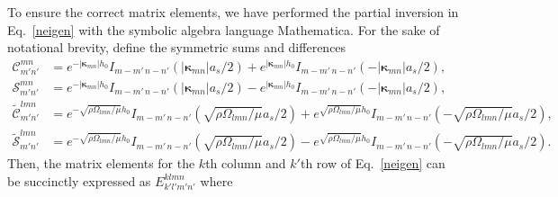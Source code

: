 \documentclass[aps,pre,amsmath,amssymb,floatfix,onecolumn,notitlepage,10pt]{revtex4-1}
\begin{document}
To ensure the correct matrix elements, we have performed the partial inversion in Eq.~\eqref{neigen} with the symbolic algebra language Mathematica.  For the sake of notational brevity, define the symmetric sums and differences
\begin{align*}
\mathcal{C}^{mn}_{m'n'} &= e^{-|\bm{\kappa}_{mn}|h_0}I_{m-m'\, n-n'} \left(|\bm{\kappa}_{mn}|a_s/2\right) + e^{|\bm{\kappa}_{mn}|h_0}I_{m-m'\, n-n'} \left(-|\bm{\kappa}_{mn}|a_s/2\right), \\
\mathcal{S}^{mn}_{m'n'} &= e^{-|\bm{\kappa}_{mn}|h_0}I_{m-m'\, n-n'} \left(|\bm{\kappa}_{mn}|a_s/2\right) - e^{|\bm{\kappa}_{mn}|h_0}I_{m-m'\, n-n'} \left(-|\bm{\kappa}_{mn}|a_s/2\right), \\
\tilde{\mathcal{C}}^{lmn}_{m'n'} &= e^{-\sqrt{\rho\Omega_{lmn}/\mu}h_0}I_{m-m'\, n-n'} \left(\sqrt{\rho\Omega_{lmn}/\mu}a_s/2\right) + e^{\sqrt{\rho\Omega_{lmn}/\mu}h_0}I_{m-m'\, n-n'} \left(-\sqrt{\rho\Omega_{lmn}/\mu}a_s/2\right), \\
\tilde{\mathcal{S}}^{lmn}_{m'n'} &= e^{-\sqrt{\rho\Omega_{lmn}/\mu}h_0}I_{m-m'\, n-n'} \left(\sqrt{\rho\Omega_{lmn}/\mu}a_s/2\right) - e^{\sqrt{\rho\Omega_{lmn}/\mu}h_0}I_{m-m'\, n-n'} \left(-\sqrt{\rho\Omega_{lmn}/\mu}a_s/2\right).
\end{align*}
Then, the matrix elements for the $k$th column and $k'$th row of Eq.~\eqref{neigen} can be succinctly expressed as $E_{k'l'm'n'}^{klmn}$ where
\end{document}
